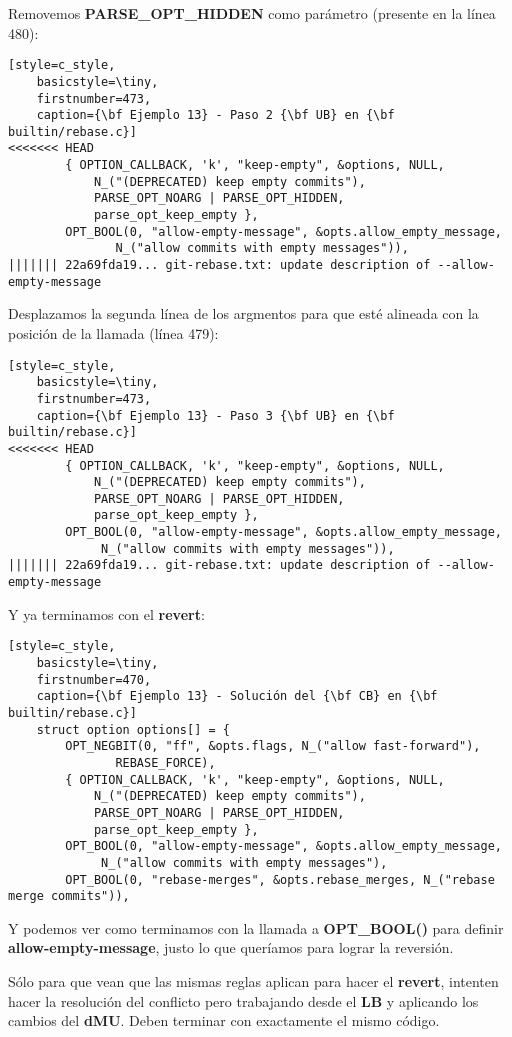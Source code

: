 Removemos {\bf PARSE\_OPT\_HIDDEN} como parámetro (presente en la línea 480):
\begin{lstlisting}[style=c_style,
	basicstyle=\tiny,
	firstnumber=473,
	caption={\bf Ejemplo 13} - Paso 2 {\bf UB} en {\bf builtin/rebase.c}]
<<<<<<< HEAD
		{ OPTION_CALLBACK, 'k', "keep-empty", &options, NULL,
			N_("(DEPRECATED) keep empty commits"),
			PARSE_OPT_NOARG | PARSE_OPT_HIDDEN,
			parse_opt_keep_empty },
		OPT_BOOL(0, "allow-empty-message", &opts.allow_empty_message,
			   N_("allow commits with empty messages")),
||||||| 22a69fda19... git-rebase.txt: update description of --allow-empty-message
\end{lstlisting}

Desplazamos la segunda línea de los argmentos para que esté alineada con la posición de la
llamada (línea 479):
\begin{lstlisting}[style=c_style,
	basicstyle=\tiny,
	firstnumber=473,
	caption={\bf Ejemplo 13} - Paso 3 {\bf UB} en {\bf builtin/rebase.c}]
<<<<<<< HEAD
		{ OPTION_CALLBACK, 'k', "keep-empty", &options, NULL,
			N_("(DEPRECATED) keep empty commits"),
			PARSE_OPT_NOARG | PARSE_OPT_HIDDEN,
			parse_opt_keep_empty },
		OPT_BOOL(0, "allow-empty-message", &opts.allow_empty_message,
			 N_("allow commits with empty messages")),
||||||| 22a69fda19... git-rebase.txt: update description of --allow-empty-message
\end{lstlisting}

Y ya terminamos con el {\bf revert}:

\begin{lstlisting}[style=c_style,
	basicstyle=\tiny,
	firstnumber=470,
	caption={\bf Ejemplo 13} - Solución del {\bf CB} en {\bf builtin/rebase.c}]
	struct option options[] = {
		OPT_NEGBIT(0, "ff", &opts.flags, N_("allow fast-forward"),
			   REBASE_FORCE),
		{ OPTION_CALLBACK, 'k', "keep-empty", &options, NULL,
			N_("(DEPRECATED) keep empty commits"),
			PARSE_OPT_NOARG | PARSE_OPT_HIDDEN,
			parse_opt_keep_empty },
		OPT_BOOL(0, "allow-empty-message", &opts.allow_empty_message,
			 N_("allow commits with empty messages"),
		OPT_BOOL(0, "rebase-merges", &opts.rebase_merges, N_("rebase merge commits")),
\end{lstlisting}

Y podemos ver como terminamos con la llamada a {\bf OPT\_BOOL()} para definir {\bf allow-empty-message}, justo lo que
queríamos para lograr la reversión.

Sólo para que vean que las mismas reglas aplican para hacer el {\bf revert}, intenten hacer la resolución del conflicto pero
trabajando desde el {\bf LB} y aplicando los cambios del {\bf dMU}. Deben terminar con exactamente el mismo código.

